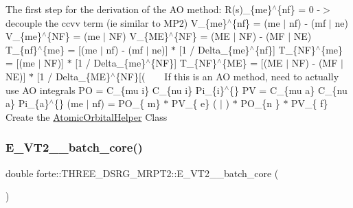 The first step for the derivation of the AO method\+: R(s)\+\_\+\{me\}$^\wedge$\{nf\} = 0 -\/$>$ decouple the ccvv term (ie similar to M\+P2) V\+\_\+\{me\}$^\wedge$\{nf\} = (me $\vert$ nf) -\/ (mf $\vert$ ne) V\+\_\+\{me\}$^\wedge$\{NF\} = (me $\vert$ NF) V\+\_\+\{ME\}$^\wedge$\{NF\} = (ME $\vert$ NF) -\/ (MF $\vert$ NE) ~\newline
~\newline
~\newline
 T\+\_\+\{nf\}$^\wedge$\{me\} = \mbox{[}(me $\vert$ nf) -\/ (mf $\vert$ ne)\mbox{]} $\ast$ \mbox{[}1 / Delta\+\_\+\{me\}$^\wedge$\{nf\}\mbox{]} T\+\_\+\{NF\}$^\wedge$\{me\} = \mbox{[}(me $\vert$ NF)\mbox{]} $\ast$ \mbox{[}1 / Delta\+\_\+\{me\}$^\wedge$\{NF\}\mbox{]} T\+\_\+\{NF\}$^\wedge$\{ME\} = \mbox{[}(ME $\vert$ NF) -\/ (MF $\vert$ NE)\mbox{]} $\ast$ \mbox{[}1 / Delta\+\_\+\{ME\}$^\wedge$\{NF\}\mbox{[}( ~\newline
~\newline
 If this is an AO method, need to actually use AO integrals PO = C\+\_\+\{mu i\} C\+\_\+\{nu i\} Pi\+\_\+\{i\}$^\wedge$\{\} PV = C\+\_\+\{mu a\} C\+\_\+\{nu a\} Pi\+\_\+\{a\}$^\wedge$\{\} (me $\vert$ nf) = P\+O\+\_\+\{ m\} $\ast$ P\+V\+\_\+\{ e\} (  $\vert$  ) $\ast$ P\+O\+\_\+\{n  \} $\ast$ P\+V\+\_\+\{ f\} ~\newline
 Create the \mbox{\hyperlink{classforte_1_1_atomic_orbital_helper}{Atomic\+Orbital\+Helper}} Class \mbox{\label{classforte_1_1_t_h_r_e_e___d_s_r_g___m_r_p_t2_a6a84aade3b602722ad7f0842865128db}} 
\subsubsection{\texorpdfstring{E\+\_\+\+V\+T2\+\_\+\_\+batch\+\_\+core()}{E\_VT2\_2\_batch\_core()}}
{\footnotesize\ttfamily double forte\+::\+T\+H\+R\+E\+E\+\_\+\+D\+S\+R\+G\+\_\+\+M\+R\+P\+T2\+::\+E\+\_\+\+V\+T2\+\_\+\_\+batch\+\_\+core (\begin{DoxyParamCaption}{ }\end{DoxyParamCaption})\hspace{0.3cm}{\ttfamily [protected]}}



